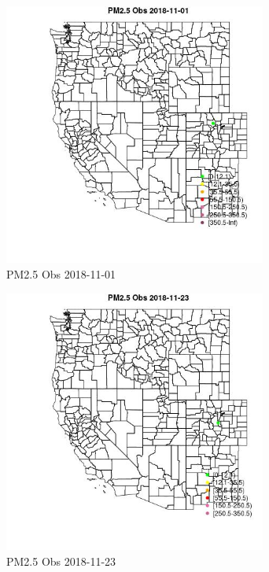 \begin{figure} 
\centering  
\includegraphics[width=0.77\textwidth]{Code_Outputs/Report_ML_input_PM25_Step4_part_e_de_duplicated_aves_MapObsPM25_Obs2018-11-01.jpg} 
\caption{\label{fig:Report_ML_input_PM25_Step4_part_e_de_duplicated_avesMapObsPM25_Obs2018-11-01}PM2.5 Obs 2018-11-01} 
\end{figure} 
 

\begin{figure} 
\centering  
\includegraphics[width=0.77\textwidth]{Code_Outputs/Report_ML_input_PM25_Step4_part_e_de_duplicated_aves_MapObsPM25_Obs2018-11-23.jpg} 
\caption{\label{fig:Report_ML_input_PM25_Step4_part_e_de_duplicated_avesMapObsPM25_Obs2018-11-23}PM2.5 Obs 2018-11-23} 
\end{figure} 
 

